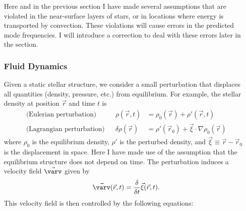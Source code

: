 Here and in the previous section I have made several assumptions that are violated in the near-surface layers of stars, or in locations where energy is transported by convection. 
These violations will cause errors in the predicted mode frequencies. 
I will introduce a correction to deal with these errors later in the section. 

\subsubsection*{Fluid Dynamics}
Given a static stellar structure, we consider a small perturbation that displaces all quantities (density, pressure, etc.) from equilibrium. %
For example, the stellar density at position $\vec r$ and time $t$ is 
\begin{align}
    \text{(Eulerian perturbation)} && 
    \rho (\vec r, t)
    &= \label{eq:eulerean}
    \rho_0 (\vec r) 
    + 
    \rho' (\vec r, t)
    \\
    \text{(Lagrangian perturbation)} &&
    \delta\rho(\vec r)
    &= \label{eq:lagrangian}
    \rho'(\vec r_0)
    +
    \vec\xi \cdot \nabla\rho_0 (\vec r)
\end{align}
where $\rho_0$ is the equilibrium density, $\rho'$ is the perturbed density, and ${\vec\xi\equiv\vec r - \vec r_0}$ is the displacement in space.
Here I have made use of the assumption that the equilibrium structure does not depend on time. 
The perturbation induces a velocity field $\vec{\varv}$ given by 
\begin{equation}
    \vec{\varv} (\vec r, t) 
    = 
    \frac{\delta}{\delta t}\vec\xi (\vec r, t).
\end{equation}
This velocity field is then controlled by the following equations: 

